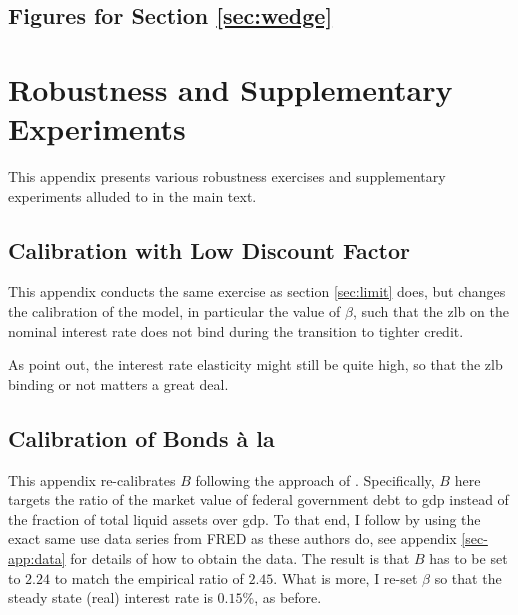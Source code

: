 \documentclass[12pt]{article} %
\numberwithin{equation}{section} %
\numberwithin{figure}{section}
\numberwithin{table}{section}
\begin{document}
\begin{refsection}
\begin{appendices}
\subsection{Figures for Section \ref{sec:wedge}}
\label{sec-app:figures-wedge}

\thispagestyle{plain}
\section{Robustness and Supplementary Experiments}
\label{sec-app:robust}

This appendix presents various robustness exercises and supplementary experiments alluded to in the main text.

\subsection{Calibration with Low Discount Factor}
\label{sec-app:robust-beta-calibration}

This appendix conducts the same exercise as section \ref{sec:limit} does, but changes the calibration of the model, in particular the value of $\beta$, such that the \Gls{zlb} on the nominal interest rate does not bind during the transition to tighter credit.

As \textcite{gl2017} point out, the interest rate elasticity might still be quite high, so that the \Gls{zlb} binding or not matters a great deal.

\subsection{Calibration of Bonds à la \textcite{bayer2023}}
\label{sec-app:robust-bonds}

This appendix re-calibrates $B$ following the approach of \textcite{bayer2023}. Specifically, $B$ here targets the ratio of the market value of federal government debt to \Gls{gdp} instead of the fraction of total liquid assets over \Gls{gdp}. To that end, I follow \textcite{bayer2023} by using the exact same use data series from FRED as these authors do, see appendix \ref{sec-app:data} for details of how to obtain the data. The result is that $B$ has to be set to $2.24$ to match the empirical ratio of $2.45$. What is more, I re-set $\beta$ so that the steady state (real) interest rate is $0.15\%$, as before.


\end{appendices}
\end{refsection}
\end{document}
